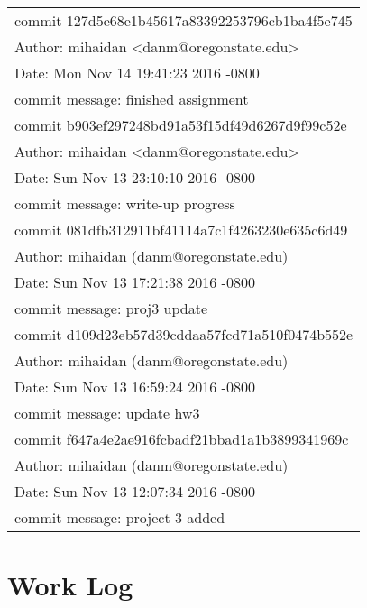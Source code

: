 \documentclass[letterpaper,10pt,onecolumn]{IEEEtran}
\begin{document}
        \begin{center}
        \def\arraystretch{1.1}
        \begin{tabular}{ | p{8cm} | }
			\hline
			commit 127d5e68e1b45617a83392253796cb1ba4f5e745 \\
			Author: mihaidan <danm@oregonstate.edu> \\
			Date:   Mon Nov 14 19:41:23 2016 -0800 \\
			commit message: finished assignment \\
            \hline
            commit b903ef297248bd91a53f15df49d6267d9f99c52e \\
            Author: mihaidan <danm@oregonstate.edu> \\
            Date:   Sun Nov 13 23:10:10 2016 -0800 \\
            commit message: write-up progress \\
            \hline
            commit 081dfb312911bf41114a7c1f4263230e635c6d49 \\
            Author: mihaidan (danm@oregonstate.edu) \\
            Date:   Sun Nov 13 17:21:38 2016 -0800 \\
            commit message: proj3 update \\
            \hline
            commit d109d23eb57d39cddaa57fcd71a510f0474b552e \\
            Author: mihaidan (danm@oregonstate.edu) \\ 
            Date:   Sun Nov 13 16:59:24 2016 -0800 \\
            commit message: update hw3 \\
            \hline
            commit f647a4e2ae916fcbadf21bbad1a1b3899341969c \\
            Author: mihaidan (danm@oregonstate.edu) \\
            Date:   Sun Nov 13 12:07:34 2016 -0800 \\
            commit message: project 3 added \\
            \hline
        \end{tabular}
        \end{center}


    
    \vspace{6mm}
    
    
    \section*{Work Log}
    
\end{document}
